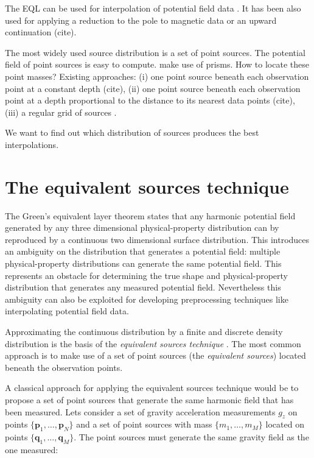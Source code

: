 \documentclass[twocolumn]{article}
\begin{document}
The EQL can be used for interpolation of potential field data
\citep{cordell1992, cooper2000}.
It has been also used for applying a reduction to the pole to magnetic data
\citep{guspi2009, silva1986, emilia1973, nakatsuka2006} or an upward
continuation (cite).

The most widely used source distribution is a set of point sources.
The potential field of point sources is easy to compute.
\citet{barnes2011} make use of prisms.
How to locate these point masses?
Existing approaches:
(i) one point source beneath each observation point at a constant depth (cite),
(ii) one point source beneath each observation point at a depth proportional to
the distance to its nearest data points (cite),
(iii) a regular grid of sources \citep{barnes2011}.

We want to find out which distribution of sources produces the best
interpolations.



\section{The equivalent sources technique}

The Green's equivalent layer theorem states that any harmonic potential field
generated by any three dimensional physical-property distribution can by
reproduced by a continuous two dimensional surface distribution.
This introduces an ambiguity on the distribution that generates
a potential field: multiple physical-property distributions can generate the
same potential field.
This represents an obstacle for determining the true shape and
physical-property distribution that generates any measured potential field.
Nevertheless this ambiguity can also be exploited for developing preprocessing
techniques like interpolating potential field data.

Approximating the continuous distribution by a finite and discrete density
distribution is the basis of the \emph{equivalent sources technique}
\citep{dampney1969}.
The most common approach is to make use of a set of point sources (the
\emph{equivalent sources}) located beneath the observation points.

A classical approach for applying the equivalent sources technique would be to
propose a set of point sources that generate the same harmonic field that has
been measured.
Lets consider a set of gravity acceleration measurements $g_z$ on points
$\{\mathbf{p}_1, \ldots, \mathbf{p}_N\}$ and a set of point sources with mass
$\{m_1, \ldots, m_M\}$ located on points
$\{\mathbf{q}_1, \ldots, \mathbf{q}_M\}$.
The point sources must generate the same gravity field as the one measured:
\end{document}
